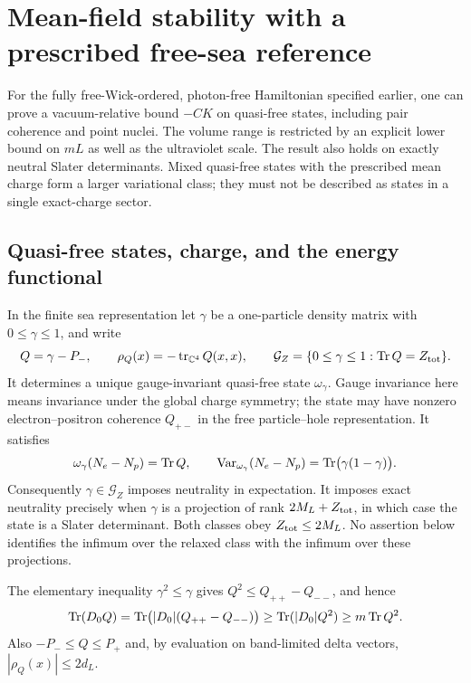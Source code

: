 \section{Mean-field stability with a prescribed free-sea reference}
\label{sec:meanfield}

For the fully free-Wick-ordered, photon-free Hamiltonian specified earlier,
one can prove a vacuum-relative bound $-CK$ on quasi-free states, including
pair coherence and point nuclei.  The volume range is restricted by an
explicit lower bound on $mL$ as well as the ultraviolet scale.  The result
also holds on exactly neutral Slater determinants.  Mixed quasi-free states
with the prescribed mean charge form a larger variational class; they must
not be described as states in a single exact-charge sector.

\subsection{Quasi-free states, charge, and the energy functional}

In the finite sea representation let $\gamma$ be a one-particle density
matrix with $0\le\gamma\le1$, and write
\[
 Q=\gamma-P_-,\qquad
 \rho_Q(x)=-\operatorname{tr}_{\mathbb C^4}Q(x,x),\qquad
 \mathcal G_Z=\{0\le\gamma\le1:\operatorname{Tr} Q=Z_{\rm tot}\}.
\]
It determines a unique gauge-invariant quasi-free state $\omega_\gamma$.
Gauge invariance here means invariance under the global charge symmetry;
the state may have nonzero electron--positron coherence $Q_{+-}$ in the
free particle--hole representation.  It satisfies
\[
 \omega_\gamma(N_e-N_p)=\operatorname{Tr} Q,
 \qquad
 \operatorname{Var}_{\omega_\gamma}(N_e-N_p)
 =\operatorname{Tr}\bigl(\gamma(1-\gamma)\bigr).
\]
Consequently $\gamma\in\mathcal G_Z$ imposes neutrality in expectation.
It imposes exact neutrality precisely when $\gamma$ is a projection of
rank $2M_L+Z_{\rm tot}$, in which case the state is a Slater determinant.
Both classes obey $Z_{\rm tot}\le2M_L$.  No assertion below identifies the
infimum over the relaxed class with the infimum over these projections.

The elementary inequality $\gamma^2\le\gamma$ gives
$Q^2\le Q_{++}-Q_{--}$, and hence
\begin{equation}
 \operatorname{Tr}(D_0Q)
 =\operatorname{Tr}\bigl(|D_0|(Q_{++}-Q_{--})\bigr)
 \ge\operatorname{Tr}(|D_0|Q^2)\ge m\operatorname{Tr} Q^2.
 \label{eq:kin-mf}
\end{equation}
Also $-P_-\le Q\le P_+$ and, by evaluation on band-limited delta vectors,
$|\rho_Q(x)|\le2d_L$.

